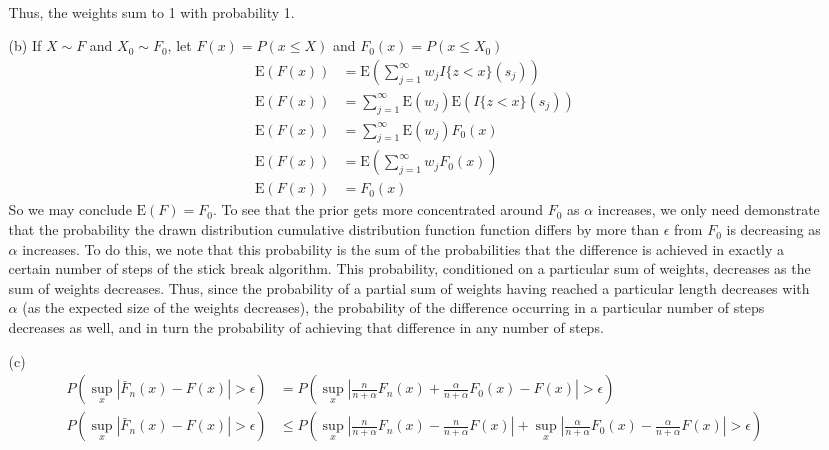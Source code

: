 \documentclass[11pt]{article}
\newcommand{\E}{\mathrm{E}}
\theoremstyle{definition}
\begin{document}
\begin{itemize}
\begin{itemize}
\begin{align*}
                \end{align*}
                Thus, the weights sum to 1 with probability 1.
            \item[(b)]
                If $X\sim F$ and $X_0\sim F_0$, let $F(x)=P(x\leq X)$ and $F_0(x)=P(x\leq X_0)$                
                    \begin{align*}
                        \E(F(x)) &= \E(\sum_{j=1}^\infty w_j I{\{z<x\}}(s_j)) \\
                        \E(F(x)) &= \sum_{j=1}^\infty \E(w_j)\E(I{\{z<x\}}(s_j)) \\
                        \E(F(x)) &= \sum_{j=1}^\infty \E(w_j)F_0(x) \\
                        \E(F(x)) &= \E(\sum_{j=1}^\infty w_jF_0(x)) \\
                        \E(F(x)) &= F_0(x) 
                    \end{align*}
                So we may conclude \(\E(F)=F_0\). To see that the prior gets more concentrated around $F_0$ as $\alpha$ increases, we only need demonstrate that the probability the drawn distribution cumulative distribution function function differs by more than $\epsilon$ from $F_0$ is decreasing as $\alpha$ increases. To do this, we note that this probability is the sum of the probabilities that the difference is achieved in exactly a certain number of steps of the stick break algorithm. This probability, conditioned on a particular sum of weights, decreases as the sum of weights decreases. Thus, since the probability of a partial sum of weights having reached a particular length decreases with $\alpha$ (as the expected size of the weights decreases), the probability of the difference occurring in a particular number of steps decreases as well, and in turn the probability of achieving that difference in any number of steps.
                \item[(c)]
                    \begin{align*}
                        P\left(\sup_x\left\vert \bar F_n(x)-F(x)\right\vert>\epsilon\right) &=P\left(\sup_x\left\vert \frac{n}{n+\alpha}F_n(x)+\frac{\alpha}{n+\alpha}F_0(x)-F(x)\right\vert>\epsilon\right) \\
                        P\left(\sup_x\left\vert \bar F_n(x)-F(x)\right\vert>\epsilon\right) &\leq P\left(\sup_x\left\vert \frac{n}{n+\alpha}F_n(x)-\frac{n}{n+\alpha}F(x)\right\vert + \sup_x\left\vert \frac{\alpha}{n+\alpha}F_0(x)-\frac{\alpha}{n+\alpha}F(x)\right\vert>\epsilon\right) \\

\end{align*}
\end{itemize}
\end{itemize}
\end{document}
